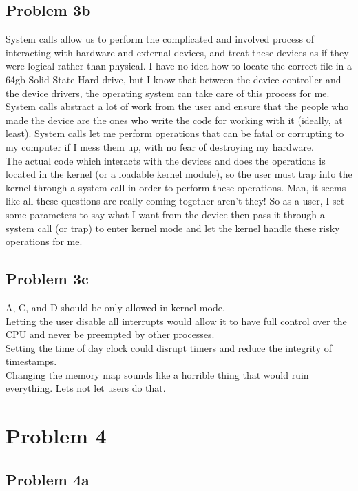 \documentclass[12pt]{article}
\begin{document}
	\subsection*{Problem 3b}
System calls allow us to perform the complicated and involved process of interacting with hardware and external devices, and treat these devices as if they were logical rather than physical. I have no idea how to locate the correct file in a 64gb Solid State Hard-drive, but I know that between the device controller and the device drivers, the operating system can take care of this process for me.\\
System calls abstract a lot of work from the user and ensure that the people who made the device are the ones who write the code for working with it (ideally, at least). System calls let me perform operations that can be fatal or corrupting to my computer if I mess them up, with no fear of destroying my hardware.\\
The actual code which interacts with the devices and does the operations is located in the kernel (or a loadable kernel module), so the user must trap into the kernel through a system call in order to perform these operations. Man, it seems like all these questions are really coming together aren't they! So as a user, I set some parameters to say what I want from the device then pass it through a system call (or trap) to enter kernel mode and let the kernel handle these risky operations for me.

	\subsection*{Problem 3c}
A, C, and D should be only allowed in kernel mode.\\
Letting the user disable all interrupts would allow it to have full control over the CPU and never be preempted by other processes.\\
Setting the time of day clock could disrupt timers and reduce the integrity of timestamps.\\
Changing the memory map sounds like a horrible thing that would ruin everything. Lets not let users do that.

\section*{Problem 4}
	\subsection*{Problem 4a}
	
\end{document}
